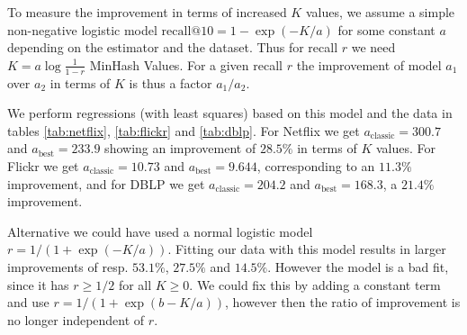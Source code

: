To measure the improvement in terms of increased $K$ values,
we assume a simple non-negative logistic model $\text{recall@10} = 1 - \exp(-K/a)$ for some constant $a$ depending on the estimator and the dataset.
Thus for recall $r$ we need $K=a\log\frac1{1-r}$ MinHash Values.
For a given recall $r$ the improvement of model $a_1$ over $a_2$ in terms of $K$ is thus a factor $a_1/a_2$.

We perform regressions (with least squares) based on this model and the data in tables \ref{tab:netflix}, \ref{tab:flickr} and \ref{tab:dblp}.
For Netflix we get $a_\text{classic}=300.7$ and $a_\text{best} = 233.9$ showing an improvement of $28.5\%$ in terms of $K$ values.
For Flickr we get $a_\text{classic}=10.73$ and $a_\text{best} = 9.644$, corresponding to an $11.3\%$ improvement,
and for DBLP we get $a_\text{classic}=204.2$ and $a_\text{best}=168.3$, a $21.4\%$ improvement.

Alternative we could have used a normal logistic model $r = 1/(1 + \exp(-K/a))$.
Fitting our data with this model results in larger improvements of resp. $53.1\%$, $27.5\%$ and $14.5\%$.
However the model is a bad fit, since it has $r\ge 1/2$ for all $K\ge 0$.
We could fix this by adding a constant term and use $r=1/(1+\exp(b-K/a))$, however then the ratio of improvement is no longer independent of $r$.




%

